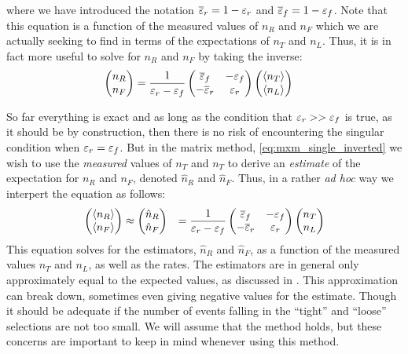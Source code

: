 where we have introduced the notation $\overline{\varepsilon}_r = 1-\varepsilon_r$
and $\overline{\varepsilon}_f =1-\varepsilon_f$.
Note that this equation is a function of the measured values of
$n_R$ and $n_F$ which we are actually seeking to find in terms of the 
expectations of $n_T$ and $n_L$. Thus, it is in fact more
useful to solve for $n_R$ and $n_F$ by taking the inverse:
\begin{align}
  \label{eq:mxm_single_inverted}
  \begin{pmatrix} n_R \\ n_F \end{pmatrix} 
  &= 
  \frac{1}{\varepsilon_r-\varepsilon_f}
  \begin{pmatrix}
  \overline{\varepsilon}_f & -\varepsilon_f \\ -\overline{\varepsilon}_r & \varepsilon_r
  \end{pmatrix} 
  \begin{pmatrix} \langle n_T\rangle \\ \langle n_L\rangle \end{pmatrix}
\end{align}

So far everything is exact and as long as the condition
that $\varepsilon_r>>\varepsilon_f$ is true,
as it should be by construction, 
then there is no risk of encountering the singular condition
when $\varepsilon_r=\varepsilon_f$.
But in the matrix method, \eqn\eqref{eq:mxm_single_inverted}
we wish to use the \emph{measured} values of $n_T$
and $n_T$ to derive an \emph{estimate} of the expectation
for $n_R$ and $n_F$, denoted $\hat{n}_R$ and $\hat{n}_F$. 
Thus, in a rather \emph{ad hoc} way 
we interpert the equation as follows:
\begin{align}
  \label{eq:mxm_single_inverted_approx}
  \begin{pmatrix} \langle n_R\rangle \\ \langle n_F\rangle \end{pmatrix} 
  &\approx
  \begin{pmatrix} \hat{n}_R \\ \hat{n}_F \end{pmatrix} 
  &= 
  \frac{1}{\varepsilon_r-\varepsilon_f}
  \begin{pmatrix}
  \overline{\varepsilon}_f & -\varepsilon_f \\ -\overline{\varepsilon}_r & \varepsilon_r
  \end{pmatrix} 
  \begin{pmatrix} n_T \\ n_L \end{pmatrix}
\end{align}
This equation solves for the estimators, $\hat{n}_R$ and $\hat{n}_F$,
as a function of the measured values $n_T$ and $n_L$, as well 
as the rates. The estimators are in general only approximately equal
to the expected values, as discussed in \cite{Gillam:2014xua}.
This approximation can break down, sometimes even giving negative values
for the estimate.  Though it should be adequate if the number
of events falling in the ``tight'' and ``loose'' selections are 
not too small.
We will assume that the method holds, but these concerns are important
to keep in mind whenever using this method.


